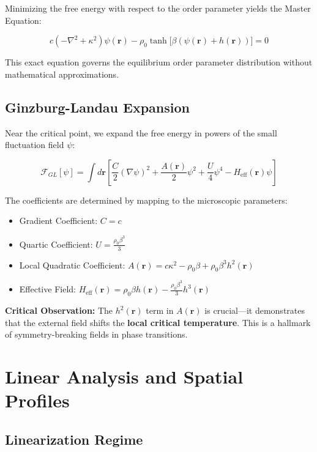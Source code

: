 \documentclass[12pt,a4paper]{article}
\begin{document}
Minimizing the free energy with respect to the order parameter yields the Master Equation:

\begin{equation}
    c(-\nabla^2 + \kappa^2)\psi(\mathbf{r}) - \rho_0 \tanh\big[\beta(\psi(\mathbf{r}) + h(\mathbf{r}))\big] = 0
\end{equation}

This exact equation governs the equilibrium order parameter distribution without mathematical approximations.

\subsection{Ginzburg-Landau Expansion}

Near the critical point, we expand the free energy in powers of the small fluctuation field $\psi$:

\begin{equation}
    \mathcal{F}_{GL}[\psi] = \int d\mathbf{r} \left[ \frac{C}{2} (\nabla \psi)^2 + \frac{A(\mathbf{r})}{2} \psi^2 + \frac{U}{4} \psi^4 - H_{\text{eff}}(\mathbf{r}) \psi \right]
\end{equation}

The coefficients are determined by mapping to the microscopic parameters:

\begin{itemize}
    \item Gradient Coefficient: $C = c$
    \item Quartic Coefficient: $U = \frac{\rho_0 \beta^3}{3}$
    \item Local Quadratic Coefficient: $A(\mathbf{r}) = c\kappa^2 - \rho_0\beta + \rho_0\beta^3 h^2(\mathbf{r})$
    \item Effective Field: $H_{\text{eff}}(\mathbf{r}) = \rho_0\beta h(\mathbf{r}) - \frac{\rho_0\beta^3}{3}h^3(\mathbf{r})$
\end{itemize}

\textbf{Critical Observation:} The $h^2(\mathbf{r})$ term in $A(\mathbf{r})$ is crucial—it demonstrates that the external field shifts the \textbf{local critical temperature}. This is a hallmark of symmetry-breaking fields in phase transitions.

\section{Linear Analysis and Spatial Profiles}

\subsection{Linearization Regime}
\end{document}
